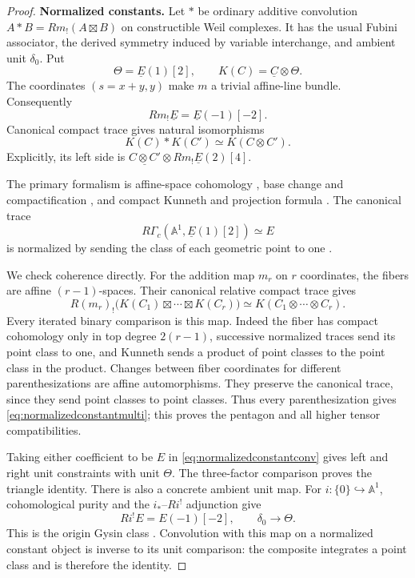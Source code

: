 \documentclass[11pt,a4paper]{article}
\newcommand{\A}{\mathbb A}\newcommand{\PP}{\mathbb P}\newcommand{\GL}{\mathrm{GL}}
\theoremstyle{named}\newtheorem{finding}{Finding}[section]
\theoremstyle{definition}\newtheorem{definition}[finding]{Definition}
\theoremstyle{remark}\newtheorem{remark}[finding]{Remark}
\begin{document}
\begin{proof}
\par\smallskip\noindent\textbf{Normalized constants.}\quad
Let $*$ be ordinary additive convolution
$A*B=Rm_!(A\boxtimes B)$ on constructible Weil complexes.
It has the usual Fubini associator, the derived symmetry
induced by variable interchange, and ambient unit $\delta_0$.
Put
\[
 \Theta=\underline E(1)[2],\qquad
 K(C)=\underline C\otimes\Theta.
\]
The coordinates $(s=x+y,y)$ make $m$ a trivial affine-line bundle.
Consequently
\[
 Rm_!\underline E=\underline E(-1)[-2].
\]
Canonical compact trace gives natural isomorphisms
\begin{equation}\label{eq:normalizedconstantconv}
 K(C)*K(C')\simeq K(C\otimes C').
\end{equation}
Explicitly, its left side is
$\underline{C\otimes C'}\otimes Rm_!\underline E(2)[4]$.

The primary formalism is affine-space cohomology
\cite[Example~16.3, p.~109]{Milne},
base change and compactification
\cite[Theorem~17.10, p.~116; Proposition~18.4,
pp.~121--122]{Milne}, and compact Kunneth and projection
formula \cite[Theorem~22.1, Remarks~22.3(b),(d),
Proposition~22.5, pp.~135--137]{Milne}.
The canonical trace
\[
 R\Gamma_c(\A^1,\underline E(1)[2])\simeq E
\]
is normalized by sending the class of each geometric point
to one \cite[Theorem~24.1(a),(b), p.~144]{Milne}.

We check coherence directly. For the addition map $m_r$
on $r$ coordinates, the fibers are affine $(r-1)$-spaces.
Their canonical relative compact trace gives
\begin{equation}\label{eq:normalizedconstantmulti}
 R(m_r)_!\bigl(K(C_1)\boxtimes\cdots\boxtimes K(C_r)\bigr)
 \simeq K(C_1\otimes\cdots\otimes C_r).
\end{equation}
Every iterated binary comparison is this map.
Indeed the fiber has compact cohomology only in top degree
$2(r-1)$, successive normalized traces send its point
class to one, and Kunneth sends a product of point classes
to the point class in the product.
Changes between fiber coordinates for different parenthesizations
are affine automorphisms. They preserve the canonical trace,
since they send point classes to point classes.
Thus every parenthesization gives
\eqref{eq:normalizedconstantmulti}; this proves the pentagon
and all higher tensor compatibilities.

Taking either coefficient to be $E$ in
\eqref{eq:normalizedconstantconv} gives left and right unit
constraints with unit $\Theta$. The three-factor comparison
proves the triangle identity.
There is also a concrete ambient unit map.
For $i:\{0\}\hookrightarrow\A^1$, cohomological purity and
the $i_*$--$Ri^!$ adjunction give
\[
 Ri^!E=E(-1)[-2],\qquad \delta_0\longrightarrow\Theta.
\]
This is the origin Gysin class
\cite[Theorem~16.1, p.~108; Theorem~16.7 and its
preceding adjunction, p.~111]{Milne}.
Convolution with this map on a normalized constant object
is inverse to its unit comparison: the composite integrates
a point class and is therefore the identity.


\end{proof}
\end{document}

